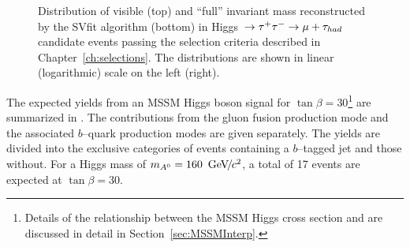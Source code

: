\begin{figure}
\begin{center}
\caption[Distributions of final selected events]{Distribution of visible (top)
and ``full'' \TT invariant mass reconstructed by the SVfit algorithm (bottom) in
\mbox{Higgs $\to \tau^+\tau^- \to \mu + \tau_{had}$} candidate events passing the selection
criteria described in Chapter~\ref{ch:selections}.  The distributions are shown
in linear (logarithmic) scale on the left (right).}
\label{fig:AHtoMuTauPlotsLoose}
\end{center}
\end{figure} 

The expected yields from an MSSM Higgs boson signal for \mbox{$\tan\beta =
30$}\footnote{Details of the relationship between the MSSM Higgs cross section
and \tb are discussed in detail in Section~\ref{sec:MSSMInterp}.}
are summarized in \label{tab:SignalExpResultsLooseAHtoMuTau}.  The contributions
from the gluon fusion production mode and the associated $b$--quark production
modes are given separately.  The yields are divided into the exclusive
categories of events containing a \mbox{$b$--tagged} jet and those without.  For a
Higgs mass of $m_{A^0} = 160~{\,\text{Ge\hspace{-.08em}V\hspace{-0.16em}/\hspace{-0.08em}}c^\text{2}}$, a total of 17 events are expected at
$\tan\beta = 30$.
%
